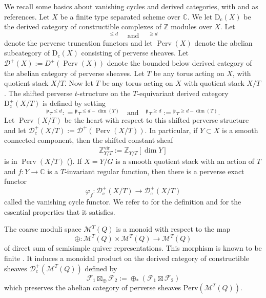 \documentclass{amsart}
\def\BC{{\mathbb{C}}}
\def\BZ{{\mathbb{Z}}}
\def\vir{\mathrm{vir}}
\DeclareMathOperator{\ptau}{{}^{\mathfrak{p}}\tau}
\DeclareMathOperator{\Per}{\mathrm{Perv}}
\begin{document}
We recall some basics about vanishing cycles and derived categories, with \cite{davison2020cohomological} and \cite{achar} as references. Let $X$ be a finite type separated scheme over $\BC$. We let $\mathrm{D}_{\mathrm{c}}(X)$ be the derived category of constructible complexes of $\BZ$ modules over $X$. Let 
$$
\ptau^{\leq d} \quad \text{and} \quad \ptau^{\geq d}
$$
denote the perverse truncation functors and let $\Per(X)$ denote the abelian subcategory of $\mathrm{D}_{\mathrm{c}}(X)$ consisting of perverse sheaves. Let $\mathcal{D}^+(X):= D^+(\Per(X))$ denote the bounded below derived category of the abelian category of perverse sheaves. Let $T$ be any torus acting on $X$, with quotient stack $X/T$. Now let $T$ be any torus acting on $X$ with quotient stack $X/T$. The shifted perverse $t$-structure on the $T$-equivariant derived category $\mathrm{D}^{+}_{\mathrm{c}}(X/T)$ is defined by setting 
$$
{}^{\mathfrak{p}}\!\tau^{\leq d} : = {}^{\mathfrak{p}}\!\tau^{\leq d - \dim(T)} \quad \text{and} \quad {}^{\mathfrak{p}}\!\tau^{\geq d} := {}^{\mathfrak{p}}\!\tau^{\geq d - \dim(T)}.
$$
Let $\Per(X/T)$ be the heart with respect to this shifted perverse structure and let $\mathcal{D}^+_c(X/T) := \mathcal{D}^+(\Per(X/T))$.  In particular, if $Y \subset X$ is a smooth connected component, then the shifted constant sheaf 
$$
\BZ^{\vir}_{Y/T}:= \BZ_{Y/T}[\dim Y] 
$$
is in  $\Per(X/T)$ (\cite[Lemma 3.3.12]{achar}). If $X=Y/G$ is a smooth quotient stack with an action of $T$ and $f\colon Y\rightarrow \mathbb{C}$ is a $T$-invariant regular function, then there is a perverse exact functor 
$$
\varphi_f\colon \mathcal{D}^+_{\mathrm{c}}(X/T)\rightarrow \mathcal{D}^+_{\mathrm{c}}(X/T)
$$
called the vanishing cycle functor.  We refer to \cite[Section 8.6]{schapira} for the definition and \cite[Proposition 2.13]{davison2020cohomological} for the essential properties that it satisfies.

\medskip 

The coarse moduli space $\mathcal{M}^T(Q)$ is a monoid with respect to the map
\[ 
\oplus: \mathcal{M}^T(Q) \times \mathcal{M}^T(Q) \rightarrow \mathcal{M}^T(Q)
\] 
of direct sum of semisimple quiver representations. This morphism is known to be finite \cite{svenrein}. It induces a monoidal product on the derived category of constructible sheaves $\mathcal{D}^+_c(\mathcal{M}^T(Q))$ defined by 
\begin{equation}
\label{eqn:box}
\mathcal{F}_1 \boxtimes_{\oplus} \mathcal{F}_2 := \oplus_{*}(\mathcal{F}_1 \boxtimes \mathcal{F}_2) 
\end{equation}
which preserves the abelian category of perverse sheaves $\mathrm{Perv}(\mathcal{M}^T(Q))$.
\end{document}
